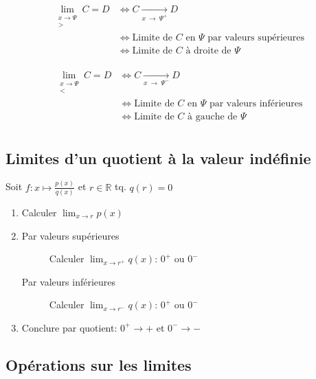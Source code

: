 \documentclass{article}
\newcommand{\R}{\mathds{R}}
\newcommand{\goesto}[2]{\xrightarrow[#1\:\to\:#2]{}}
\begin{document}
\begin{equation*}
    \begin{split}
        \lim_{\substack{x\to\Psi \\ >}} C = D &\iff C \goesto{x}{\Psi^+} D \\
        &\iff \text{Limite de $C$ en $\Psi$ par valeurs supérieures} \\
        &\iff \text{Limite de $C$ à droite de $\Psi$} \\
    \end{split}
\end{equation*}

\begin{equation*}
    \begin{split}
         \lim_{\substack{x\to\Psi \\ <}} C = D &\iff C \goesto{x}{\Psi^-} D\\
        &\iff \text{Limite de $C$ en $\Psi$ par valeurs inférieures} \\
        &\iff \text{Limite de $C$ à gauche de $\Psi$} \\
    \end{split}
\end{equation*}

\subsection{Limites d'un quotient à la valeur indéfinie}

Soit $f:x\mapsto\frac{p(x)}{q(x)}$ et $r \in \R$ tq. $q(r) = 0$

\begin{enumerate}
    \item Calculer $\displaystyle \lim_{x\to r} p(x)$
    \item
        \begin{description}
        
            \item[Par valeurs supérieures] Calculer $\displaystyle\lim_{x\to r^+} q(x)$: $0^+$ ou $0^-$
            \item[Par valeurs inférieures] Calculer $\displaystyle\lim_{x\to r^-} q(x)$: $0^+$ ou $0^-$
        \end{description}
    \item Conclure par quotient: $0^+ \to +$ et $0^- \to -$
\end{enumerate}



\subsection{Opérations sur les limites}\label{ops_limites}
\end{document}
